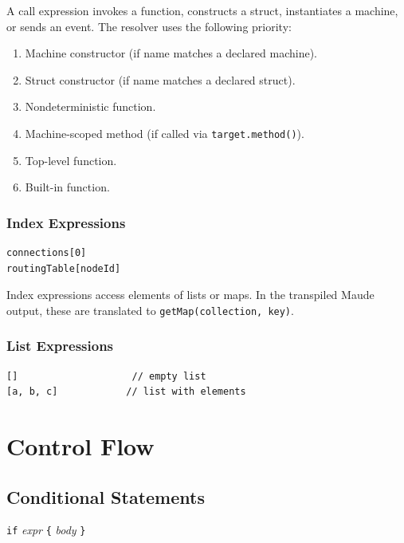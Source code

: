 \documentclass[11pt,letterpaper]{article}
\begin{document}
A call expression invokes a function, constructs a struct, instantiates a
machine, or sends an event.  The resolver uses the following priority:
\begin{enumerate}
  \item Machine constructor (if name matches a declared machine).
  \item Struct constructor (if name matches a declared struct).
  \item Nondeterministic function.
  \item Machine-scoped method (if called via \texttt{target.method()}).
  \item Top-level function.
  \item Built-in function.
\end{enumerate}

\subsubsection{Index Expressions}

\begin{lstlisting}[numbers=none]
connections[0]
routingTable[nodeId]
\end{lstlisting}

Index expressions access elements of lists or maps.  In the transpiled
Maude output, these are translated to \texttt{getMap(collection, key)}.

\subsubsection{List Expressions}

\begin{lstlisting}[numbers=none]
[]                    // empty list
[a, b, c]            // list with elements
\end{lstlisting}


\section{Control Flow}
\label{sec:control}

\subsection{Conditional Statements}

\begin{syntaxbox}[if]
\texttt{if} \textit{expr} \texttt{\{} \textit{body} \texttt{\}}
\end{syntaxbox}
\end{document}
